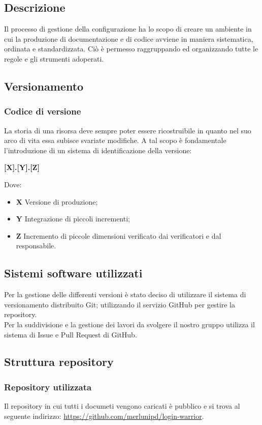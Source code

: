  \subsection{Descrizione}
    Il processo di gestione della configurazione ha lo scopo di creare un ambiente in cui la produzione di
    documentazione e di codice avviene in maniera sistematica, ordinata e standardizzata. Ciò è permesso
    raggruppando ed organizzando tutte le regole e gli strumenti adoperati.
 \subsection{Versionamento}
   \subsubsection{Codice di versione}
   La storia di una risorsa deve sempre poter essere ricostruibile in quanto nel suo arco di vita essa subisce
   svariate modifiche. A tal scopo è fondamentale l'introduzione di un sistema di identificazione della
   versione:
   \begin{center}
       \textbf{[X].[Y].[Z]}
   \end{center}
   Dove:
   \begin{itemize}
       \item \textbf{X} Versione di produzione;
       \item \textbf{Y} Integrazione di piccoli incrementi;
       \item \textbf{Z} Incremento di piccole dimensioni verificato dai verificatori e dal responsabile.
   \end{itemize}


 \subsection{Sistemi software utilizzati}
 Per la gestione delle differenti versioni è stato deciso di utilizzare il sistema
 di versionamento distribuito Git; utilizzando il servizio GitHub per gestire la repository.\\
 Per la suddivisione e la gestione dei lavori da svolgere il nostro gruppo utilizza il sistema di Issue e Pull Request di GitHub.\\

 \subsection{Struttura repository}
  \subsubsection{Repository utilizzata}
  Il repository in cui tutti i documeti vengono caricati è pubblico e si trova al seguente indirizzo:
  \url{https://github.com/merlunipd/login-warrior}.

